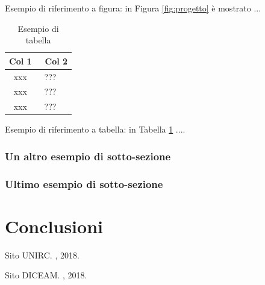 \documentclass[envcountsame,envcountchap]{svmono}
\begin{document}
Esempio di riferimento a figura: in Figura \ref{fig:progetto} è mostrato ... 



\begin{table}[t]
    \begin{center}
    \begin{tabular}{||c|l||}
      \hline
      \hline
     Col 1  & \ Col 2 \\ \hline
      xxx  & \ ??? \\ \hline
      xxx  & \ ??? \\ \hline
      xxx & \ ??? \\ \hline
    \hline
    \hline
    \end{tabular}
    \end{center}
    \caption{Esempio di tabella}\label{table:notation}
\end{table}


Esempio di riferimento a tabella: in Tabella \ref{table:notation} ....


\subsection{Un altro esempio di sotto-sezione}
\Blindtext[5]

\subsection{Ultimo esempio di sotto-sezione}
\Blindtext[5]




\chapter{Conclusioni}
\label{cap:conclusioni}


\Blindtext[6]






\begin{thebibliography}{1}
	
	{Sito UNIRC}.
	, 2018.
	
	Sito DICEAM.
	, 2018.
	
\end{thebibliography}
\end{document}
